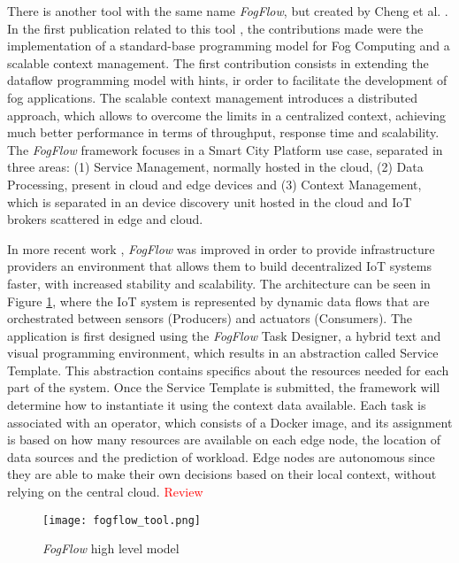 \par There is another tool with the same name \textit{FogFlow}, but created by Cheng et al. \cite{fogflow_github}. In the first publication related to this tool \cite{fog_flow_easy}, the contributions made were the implementation of a standard-base programming model for Fog Computing and a scalable context management. The first contribution consists in extending the dataflow programming model with hints, ir order to facilitate the development of fog applications. The scalable context management introduces a distributed approach, which allows to overcome the limits in a centralized context, achieving much better performance in terms of throughput, response time and scalability. The \textit{FogFlow} framework focuses in a Smart City Platform use case, separated in three areas: (1) Service Management, normally hosted in the cloud, (2) Data Processing, present in cloud and edge devices and (3) Context Management, which is separated in an device discovery unit hosted in the cloud and IoT brokers scattered in edge and cloud.
\par In more recent work \cite{fog_flow_tool}, \textit{FogFlow} was improved in order to provide infrastructure providers an environment that allows them to build decentralized IoT systems faster, with increased stability and scalability. The architecture can be seen in Figure \ref{fig:fogflow_tool}, where the IoT system is represented by dynamic data flows that are orchestrated between sensors (Producers) and actuators (Consumers). The application is first designed using the \textit{FogFlow} Task Designer, a hybrid text and visual programming environment, which results in an abstraction called Service Template. This abstraction contains specifics about the resources needed for each part of the system. Once the Service Template is submitted, the framework will determine how to instantiate it using the context data available. Each task is associated with an operator, which consists of a Docker image, and its assignment is based on how many resources are available on each edge node, the location of data sources and the prediction of workload. Edge nodes are autonomous since they are able to make their own decisions based on their local context, without relying on the central cloud. \textcolor{red}{Review}

\begin{figure}[h]
\caption{\textit{FogFlow} high level model \cite{fog_flow_tool}}
\label{fig:fogflow_tool}
\centering
\texttt{[image: fogflow\_tool.png]}
\end{figure}

